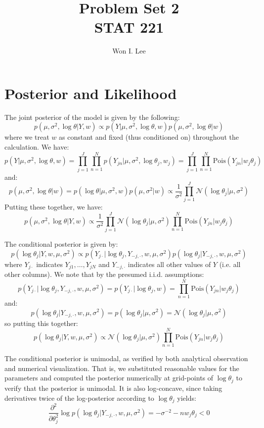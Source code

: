 \documentclass[psamsfonts]{amsart}
\title{Problem Set 2 \\ STAT 221}
\author{Won I. Lee}
\theoremstyle{definition}
\theoremstyle{remark}
\numberwithin{equation}{section}
\begin{document}
	
\maketitle

\section{Posterior and Likelihood}

The joint posterior of the model is given by the following:
$$p(\mu, \sigma^2, \log \theta|Y, w) \propto p(Y|\mu, \sigma^2, \log\theta, w) p(\mu, \sigma^2, \log\theta|w)$$
where we treat $w$ as constant and fixed (thus conditioned on) throughout the calculation. We have:
$$p(Y|\mu, \sigma^2, \log\theta, w) = \prod_{j=1}^J \prod_{n=1}^N p(Y_{jn}|\mu, \sigma^2, \log\theta_j, w_j) = \prod_{j=1}^J \prod_{n=1}^N \text{Pois}(Y_{jn}|w_j\theta_j)$$
and:
$$p(\mu, \sigma^2, \log\theta|w) = p(\log\theta|\mu,\sigma^2,w)p(\mu,\sigma^2|w) \propto \frac{1}{\sigma^2}\prod_{j=1}^J \mathcal{N}(\log\theta_j|\mu, \sigma^2)$$
Putting these together, we have:
$$p(\mu, \sigma^2, \log\theta|Y, w) \propto \frac{1}{\sigma^2} \prod_{j=1}^J \mathcal{N}(\log\theta_j|\mu, \sigma^2)\prod_{n=1}^N \text{Pois}(Y_{jn}|w_j\theta_j)$$

The conditional posterior is given by:
$$p(\log\theta_j|Y, w, \mu, \sigma^2) \propto p(Y_{j\cdot}|\log\theta_j, Y_{-j,\cdot}, w, \mu, \sigma^2) p(\log\theta_j|Y_{-j,\cdot}, w, \mu, \sigma^2) $$
where $Y_{j\cdot}$ indicates $Y_{j1}, \dots, Y_{jN}$ and $Y_{-j, \cdot}$ indicates all other values of $Y$ (i.e. all other columns). We note that by the presumed i.i.d. assumptions:
$$p(Y_{j\cdot}|\log\theta_j, Y_{-j,\cdot}, w, \mu, \sigma^2) = p(Y_{j\cdot}|\log\theta_j, w) = \prod_{n=1}^N\text{Pois}(Y_{jn}|w_j\theta_j)$$
and:
$$p(\log\theta_j|Y_{-j,\cdot}, w, \mu, \sigma^2) = p(\log\theta_j|\mu,\sigma^2) = \mathcal{N}(\log\theta_j|\mu, \sigma^2)$$
so putting this together:
$$p(\log\theta_j|Y, w, \mu, \sigma^2)\propto \mathcal{N}(\log\theta_j|\mu, \sigma^2) \prod_{n=1}^N \text{Pois}(Y_{jn}|w_j\theta_j)$$

The conditional posterior is unimodal, as verified by both analytical observation and numerical visualization. That is, we substituted reasonable values for the parameters and computed the posterior numerically at grid-points of $\log\theta_j$ to verify that the posterior is unimodal. It is also log-concave, since taking derivatives twice of the log-posterior according to $\log\theta_j$ yields:
$$\frac{\partial^2}{\partial \theta_j^2} \log p(\log\theta_j|Y_{-j,\cdot}, w, \mu, \sigma^2) = -\sigma^{-2} - nw_j\theta_j < 0$$
\end{document}

